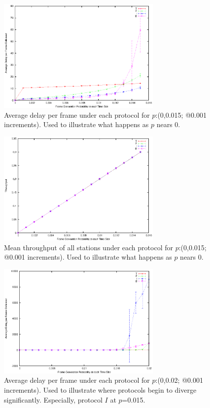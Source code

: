 \documentclass[twocolumn]{article}
\begin{document}
\begin{figure}
    \centering \includegraphics[width=8cm]{plots/small_delay.eps}
    \caption{\footnotesize Average delay per frame under each protocol for
    $p$:(0,0.015; @0.001 increments). Used to illustrate what happens as $p$
    nears 0.} \label{fig:delay_small}
\end{figure}

\begin{figure}
    \centering \includegraphics[width=8cm]{plots/small_throughput.eps}
    \caption{\footnotesize Mean throughput of all stations under each protocol
    for $p$:(0,0.015; @0.001 increments). Used to illustrate what happens as $p$
    nears 0.} \label{fig:throughput_small}
\end{figure}

\begin{figure}
    \centering \includegraphics[width=8cm]{plots/ib_diverge_delay.eps}
    \caption{\footnotesize Average delay per frame under each protocol for
    $p$:(0,0.02; @0.001 increments). Used to illustrate where protocols begin to
    diverge significantly. Especially, protocol $I$ at $p$=0.015.}
    \label{fig:delay_ib}
\end{figure}
\end{document}
